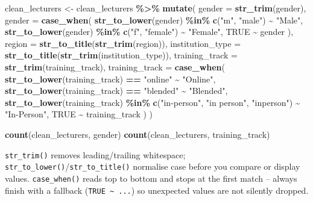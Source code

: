 \documentclass[11pt]{article}
\newenvironment{Shaded}{\begin{snugshade}}{\end{snugshade}}
\newcommand{\AttributeTok}[1]{\textcolor[rgb]{0.13,0.29,0.53}{#1}}
\newcommand{\ConstantTok}[1]{\textcolor[rgb]{0.56,0.35,0.01}{#1}}
\newcommand{\FunctionTok}[1]{\textcolor[rgb]{0.13,0.29,0.53}{\textbf{#1}}}
\newcommand{\NormalTok}[1]{#1}
\newcommand{\OtherTok}[1]{\textcolor[rgb]{0.56,0.35,0.01}{#1}}
\newcommand{\SpecialCharTok}[1]{\textcolor[rgb]{0.81,0.36,0.00}{\textbf{#1}}}
\newcommand{\StringTok}[1]{\textcolor[rgb]{0.31,0.60,0.02}{#1}}
\begin{document}
\begin{Shaded}
\begin{Highlighting}[]
\NormalTok{clean\_lecturers }\OtherTok{\textless{}{-}}\NormalTok{ clean\_lecturers }\SpecialCharTok{\%\textgreater{}\%}
  \FunctionTok{mutate}\NormalTok{(}
    \AttributeTok{gender =} \FunctionTok{str\_trim}\NormalTok{(gender),}
    \AttributeTok{gender =} \FunctionTok{case\_when}\NormalTok{(}
      \FunctionTok{str\_to\_lower}\NormalTok{(gender) }\SpecialCharTok{\%in\%} \FunctionTok{c}\NormalTok{(}\StringTok{"m"}\NormalTok{, }\StringTok{"male"}\NormalTok{) }\SpecialCharTok{\textasciitilde{}} \StringTok{"Male"}\NormalTok{,}
      \FunctionTok{str\_to\_lower}\NormalTok{(gender) }\SpecialCharTok{\%in\%} \FunctionTok{c}\NormalTok{(}\StringTok{"f"}\NormalTok{, }\StringTok{"female"}\NormalTok{) }\SpecialCharTok{\textasciitilde{}} \StringTok{"Female"}\NormalTok{,}
      \ConstantTok{TRUE} \SpecialCharTok{\textasciitilde{}}\NormalTok{ gender}
\NormalTok{    ),}
    \AttributeTok{region =} \FunctionTok{str\_to\_title}\NormalTok{(}\FunctionTok{str\_trim}\NormalTok{(region)),}
    \AttributeTok{institution\_type =} \FunctionTok{str\_to\_title}\NormalTok{(}\FunctionTok{str\_trim}\NormalTok{(institution\_type)),}
    \AttributeTok{training\_track =} \FunctionTok{str\_trim}\NormalTok{(training\_track),}
    \AttributeTok{training\_track =} \FunctionTok{case\_when}\NormalTok{(}
      \FunctionTok{str\_to\_lower}\NormalTok{(training\_track) }\SpecialCharTok{==} \StringTok{"online"} \SpecialCharTok{\textasciitilde{}} \StringTok{"Online"}\NormalTok{,}
      \FunctionTok{str\_to\_lower}\NormalTok{(training\_track) }\SpecialCharTok{==} \StringTok{"blended"} \SpecialCharTok{\textasciitilde{}} \StringTok{"Blended"}\NormalTok{,}
      \FunctionTok{str\_to\_lower}\NormalTok{(training\_track) }\SpecialCharTok{\%in\%} \FunctionTok{c}\NormalTok{(}\StringTok{"in{-}person"}\NormalTok{, }\StringTok{"in person"}\NormalTok{, }\StringTok{"inperson"}\NormalTok{) }\SpecialCharTok{\textasciitilde{}} \StringTok{"In{-}Person"}\NormalTok{,}
      \ConstantTok{TRUE} \SpecialCharTok{\textasciitilde{}}\NormalTok{ training\_track}
\NormalTok{    )}
\NormalTok{  )}

\FunctionTok{count}\NormalTok{(clean\_lecturers, gender)}
\FunctionTok{count}\NormalTok{(clean\_lecturers, training\_track)}
\end{Highlighting}
\end{Shaded}

\texttt{str\_trim()} removes leading/trailing whitespace;
\texttt{str\_to\_lower()}/\texttt{str\_to\_title()} normalise case
before you compare or display values. \texttt{case\_when()} reads top to
bottom and stops at the first match -- always finish with a fallback
(\texttt{TRUE\ \textasciitilde{}\ ...}) so unexpected values are not
silently dropped.
\end{document}
